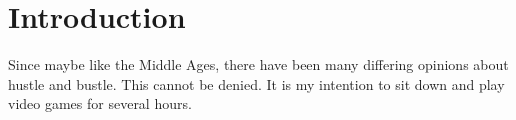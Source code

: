 \chapter{Introduction}

Since maybe like the Middle Ages, there have been many differing opinions about hustle and bustle. This cannot be denied. It is my intention to sit down and play video games for several hours.

%
%
